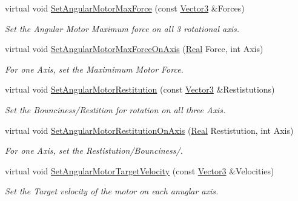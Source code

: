 \begin{DoxyCompactItemize}
virtual void \hyperlink{classphys_1_1Generic6DofConstraint_aec2cb441ebc330314fcb3c32204d4270}{SetAngularMotorMaxForce} (const \hyperlink{classphys_1_1Vector3}{Vector3} \&Forces)
\begin{DoxyCompactList}\small\item\em Set the Angular Motor Maximum force on all 3 rotational axis. \item\end{DoxyCompactList}\item 
virtual void \hyperlink{classphys_1_1Generic6DofConstraint_acea5d6e4ea817f44917bb8101bb78d33}{SetAngularMotorMaxForceOnAxis} (\hyperlink{namespacephys_af7eb897198d265b8e868f45240230d5f}{Real} Force, int Axis)
\begin{DoxyCompactList}\small\item\em For one Axis, set the Maximimum Motor Force. \item\end{DoxyCompactList}\item 
virtual void \hyperlink{classphys_1_1Generic6DofConstraint_aa345738f416fd160672881f8b6ce96c4}{SetAngularMotorRestitution} (const \hyperlink{classphys_1_1Vector3}{Vector3} \&Restistutions)
\begin{DoxyCompactList}\small\item\em Set the Bounciness/Restition for rotation on all three Axis. \item\end{DoxyCompactList}\item 
virtual void \hyperlink{classphys_1_1Generic6DofConstraint_af798448006c126df4abf6b819efa513c}{SetAngularMotorRestitutionOnAxis} (\hyperlink{namespacephys_af7eb897198d265b8e868f45240230d5f}{Real} Restistution, int Axis)
\begin{DoxyCompactList}\small\item\em For one Axis, set the Restistution/Bounciness/. \item\end{DoxyCompactList}\item 
virtual void \hyperlink{classphys_1_1Generic6DofConstraint_a45c2c3471d1498aaba83ec2d977dd43b}{SetAngularMotorTargetVelocity} (const \hyperlink{classphys_1_1Vector3}{Vector3} \&Velocities)
\begin{DoxyCompactList}\small\item\em Set the Target velocity of the motor on each anuglar axis. \item\end{DoxyCompactList}\item 

\end{DoxyCompactItemize}
